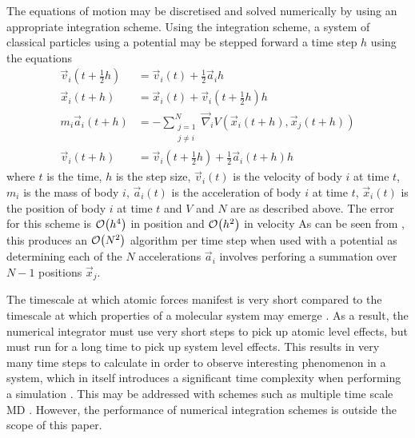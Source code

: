 %
The equations of motion may be discretised and solved numerically
by using an appropriate integration scheme.
%
Using the \velocityverlet{} integration scheme,
a system of classical particles using a \twobody{} potential
may be stepped forward a time step $h$ using the equations
%
\begin{subequations}
\label{eqn:velocity_verlet_scheme}
\begin{align}
    \vec{v}_i(t + \tfrac{1}{2} h) &=
        \vec{v}_i(t) + \tfrac{1}{2}\vec{a}_i h
    \label{eqn:velocity_verlet_v1_update}
    \\
    \vec{x}_i(t + h) &=
        \vec{x}_i(t) + \vec{v}_i(t + \tfrac{1}{2} h) h
    \label{eqn:velocity_verlet_position_update}
    \\
    m_i \vec{a}_i(t + h) &=
        - \sum_{\substack{j=1\\j\ne{}i}}^N
            \vec{\nabla}_i V(\vec{x}_i(t+h), \vec{x}_j(t+h))
    \label{eqn:velocity_verlet_force_eval}
    \\
    \vec{v}_i(t+h) &=
        \vec{v}_i(t + \tfrac{1}{2} h) + \tfrac{1}{2} \vec{a}_i(t + h) h
    \label{eqn:velocity_verlet_v2_update}
\end{align}
\end{subequations}
where $t$ is the time,
$h$ is the step size,
$\vec{v}_i(t)$ is the velocity of body $i$ at time $t$,
$m_i$ is the mass of body $i$,
$\vec{a}_i(t)$ is the acceleration of body $i$ at time $t$,
$\vec{x}_i(t)$ is the position of body $i$ at time $t$ and
$V$ and $N$ are as described above.
%
The error for this scheme is $\mathcal{O}{\left({ h^4 }\right)}$ in position and
$\mathcal{O}{\left({ h^2 }\right)}$ in velocity
\cite[p.~70]{frenkel2001understanding}
%
As can be seen from
,
this produces an $\mathcal{O}{\left({ N^2 }\right)}$ algorithm per time step
when used with a \twobody{} potential as
determining each of the $N$ accelerations $\vec{a}_i$ involves
perforing a summation over $N-1$ positions $\vec{x}_j$.

%
The timescale at which atomic forces manifest is very short compared to
the timescale at which properties of a molecular system may emerge
\cite[p.~409]{frenkel2001understanding}.
%
As a result, the numerical integrator must use very short steps to
pick up atomic level effects, but must run for a long
time to pick up system level effects.
%
This results in very many time steps to calculate in order
to observe interesting phenomenon in a system, which
in itself introduces a significant time complexity
when performing a simulation
\cite[p.~403]{schlick2010molecular}.
%
This may be addressed with schemes such as multiple time scale MD
\cite{tuckerman1992reversible}.
%
However, the performance of numerical integration schemes is outside
the scope of this paper.


